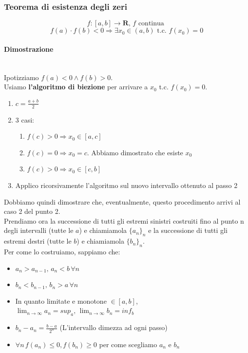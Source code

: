 \documentclass{report}
\newcommand{\subsubsubsection}[1]{\paragraph{#1}\mbox{}\\}
\begin{document}
        \subsubsection{Teorema di esistenza degli zeri}
            $$f:\left[a, b\right] \longrightarrow \mathbf{R}, \, f \textrm{ continua }$$
            $$f\left(a\right) \cdot f\left(b\right) < 0 \Longrightarrow \exists x_0 \in 
                \left(a, b\right) \textrm{ t.c. } f\left(x_0\right) = 0$$
            \subsubsubsection{Dimostrazione}
                Ipotizziamo $f\left(a\right) < 0 \wedge f\left(b\right) > 0$. \\
                Usiamo \textbf{l'algoritmo di biezione} per arrivare a $x_0$ t.c. $f\left(x_0\right) = 0$. \\
                \begin{enumerate}
                    \item $c = \frac{a + b}{2}$
                    \item 3 casi:
                        \begin{enumerate}
                            \item $f\left(c\right) > 0 \Longrightarrow x_0 \in \left[a, c\right]$
                            \item $f\left(c\right) = 0 \Longrightarrow x_0 = c$. Abbiamo dimostrato che esiste $x_0$
                            \item $f\left(c\right) > 0 \Longrightarrow x_0 \in \left[c, b\right]$
                        \end{enumerate}
                    \item Applico ricorsivamente l'algoritmo sul nuovo intervallo ottenuto al passo 2
                \end{enumerate}
                Dobbiamo quindi dimostrare che, eventualmente, questo procedimento arrivi al caso 2 del punto 2. \\
                Prendiamo ora la successione di tutti gli estremi sinistri costruiti fino al punto n degli intervalli (tutte le $a$) e chiamiamola
                $\{a_n\}_n$ e la successione di tutti gli estremi destri (tutte le $b$) e chiamiamola $\{b_n\}_n$. \\
                Per come lo costruiamo, sappiamo che:
                \begin{itemize}
                    \item $a_{n} > a_{n-1}, \, a_n < b \, \forall n$
                    \item $b_{n} < b_{n-1}, \, b_n > a \, \forall n$
                    \item In quanto limitate e monotone $\in \left[a, b\right]$, $\lim_{n \to \infty} a_n = sup_a, \, \lim_{n \to \infty} b_n = inf_b$
                    \item $b_{n} - a_{n} = \frac{b - a}{2^n}$ (L'intervallo dimezza ad ogni passo)
                    \item $\forall n \, f\left(a_n\right) \leq 0, f\left(b_n\right) \geq 0$ per come scegliamo $a_n$ e $b_n$
                \end{itemize}
\end{document}
